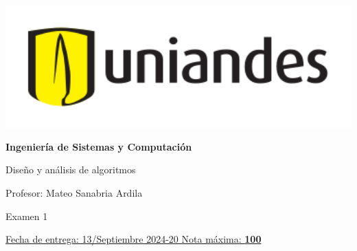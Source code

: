 \documentclass[12pt, a4paper]{exam}
\begin{document}
\noindent
\begin{minipage}[l]{0.1\textwidth}
    \noindent
    \includegraphics[width=1.8\textwidth]{Logosimbolo-uniandes_horizontal.png}
\end{minipage}
\hfill
\begin{minipage}[c]{0.8\textwidth}
    \begin{center}
        {\large \textbf{Ingeniería de Sistemas y Computación} \par
            \large	Diseño y análisis de algoritmos	\par
            \small  Profesor: Mateo Sanabria Ardila	\par
            \small  Examen 1	\par
        }
    \end{center}
\end{minipage}
\par
\vspace{0.2in}
\noindent
\uline{Fecha de entrega: 13/Septiembre 	\hfill  2024-20		\hfill Nota máxima: \textbf{100} }
\par
\vspace{0.15in}
\end{document}

